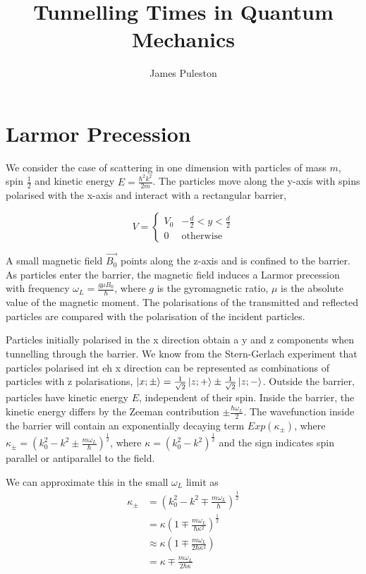 \documentclass{article}
\title{Tunnelling Times in Quantum Mechanics}
\author{James Puleston}
\begin{document}
\maketitle

\section{Larmor Precession}

We consider the case of scattering in one dimension with particles of mass $m$, spin $\frac{1}{2}$ and kinetic energy $
E = \frac{\hbar^2k^2}{2m}$. The particles move along the y-axis with spins polarised with the x-axis and interact with a rectangular barrier,

\begin{equation}
	V = 
	\begin{cases}
	V_0 & -\frac{d}{2}<y<\frac{d}{2}\\
		0 & \text{otherwise}
	\end{cases}
\end{equation}

A small magnetic field $\vec{B_{0}}$ points along the z-axis and is confined to the barrier. As particles enter the barrier, the magnetic field induces a Larmor precession with frequency $\omega_{L}=\frac{g \mu B_{0}}{\hbar}$, where $g$ is the gyromagnetic ratio, $\mu$ is the absolute value of the magnetic moment. The polarisations of the transmitted and reflected particles are compared with the polarisation of the incident particles.

Particles initially polarised in the x direction obtain a y and z components when tunnelling through the barrier. We know from the Stern-Gerlach experiment that particles polarised int eh x direction can be represented as combinations of particles with z polarisations, $\ket{x; \pm} = \frac{1}{\sqrt{2}}\ket{z;+} \pm \frac{1}{\sqrt{2}}\ket{z;-}$. Outside the barrier, particles have kinetic energy $E$, independent of their spin. Inside the barrier, the kinetic energy differs by the Zeeman contribution $\pm \frac{\hbar \omega_{L}}{2}$. The wavefunction inside the barrier will contain an exponentially decaying term $Exp(\kappa_{\pm})$, where $\kappa_{\pm} = (k^{2}_{0}-k^{2} \pm \frac{m \omega_L}{\hbar})^{\frac{1}{2}}$, where $\kappa = (k_{0}^2-k^2)^{\frac{1}{2}}$ and the sign indicates spin parallel or antiparallel to the field.  

We can approximate this in the small $\omega_L$ limit as
	\begin{align*}
		\kappa_{\pm} &= \left(k^{2}_{0}-k^{2} \mp \frac{m \omega_{L}}{\hbar}\right)^{\frac{1}{2}}\\	
			     &= \kappa \left(1 \mp \frac{m \omega_{L}}{\hbar \kappa^{2}}\right)^{\frac{1}{2}}\\
			     &\approx \kappa \left(1 \mp \frac{m \omega_{L}}{2\hbar \kappa^{2}}\right)\\
			      &= \kappa \mp \frac{m \omega_{L}}{2\hbar \kappa}
	\end{align*}
\end{document}
